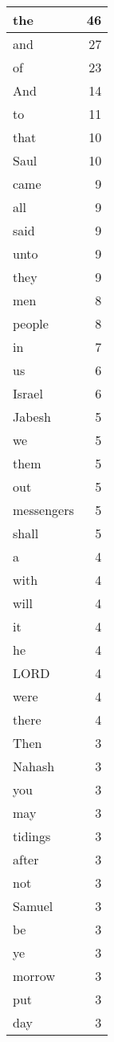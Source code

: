 \begin{center}
\begin{longtable}{l|r}
\hline \hline
\endlastfoot
the & 46 \\ \hline
and & 27 \\ \hline
of & 23 \\ \hline
And & 14 \\ \hline
to & 11 \\ \hline
that & 10 \\ \hline
Saul & 10 \\ \hline
came & 9 \\ \hline
all & 9 \\ \hline
said & 9 \\ \hline
unto & 9 \\ \hline
they & 9 \\ \hline
men & 8 \\ \hline
people & 8 \\ \hline
in & 7 \\ \hline
us & 6 \\ \hline
Israel & 6 \\ \hline
Jabesh & 5 \\ \hline
we & 5 \\ \hline
them & 5 \\ \hline
out & 5 \\ \hline
messengers & 5 \\ \hline
shall & 5 \\ \hline
a & 4 \\ \hline
with & 4 \\ \hline
will & 4 \\ \hline
it & 4 \\ \hline
he & 4 \\ \hline
LORD & 4 \\ \hline
were & 4 \\ \hline
there & 4 \\ \hline
Then & 3 \\ \hline
Nahash & 3 \\ \hline
you & 3 \\ \hline
may & 3 \\ \hline
tidings & 3 \\ \hline
after & 3 \\ \hline
not & 3 \\ \hline
Samuel & 3 \\ \hline
be & 3 \\ \hline
ye & 3 \\ \hline
morrow & 3 \\ \hline
put & 3 \\ \hline
day & 3 \\ \hline

\end{longtable}
\end{center}
